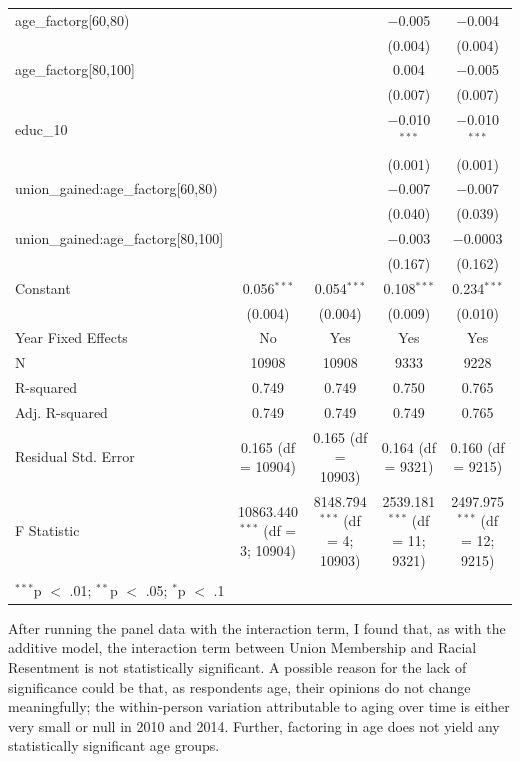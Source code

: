 \documentclass[12pt,letterpaper]{article}
\begin{document}
\begin{table}[H]
{\begin{tabular}{@{\extracolsep{5pt}}lcccc}
		age\_factorg[60,80) &  &  & $-$0.005 & $-$0.004 \\ 
		&  &  & (0.004) & (0.004) \\ 
		age\_factorg[80,100] &  &  & 0.004 & $-$0.005 \\ 
		&  &  & (0.007) & (0.007) \\ 
		educ\_10 &  &  & $-$0.010$^{***}$ & $-$0.010$^{***}$ \\ 
		&  &  & (0.001) & (0.001) \\ 
		union\_gained:age\_factorg[60,80) &  &  & $-$0.007 & $-$0.007 \\ 
		&  &  & (0.040) & (0.039) \\ 
		union\_gained:age\_factorg[80,100] &  &  & $-$0.003 & $-$0.0003 \\ 
		&  &  & (0.167) & (0.162) \\ 
		Constant & 0.056$^{***}$ & 0.054$^{***}$ & 0.108$^{***}$ & 0.234$^{***}$ \\ 
		& (0.004) & (0.004) & (0.009) & (0.010) \\ 
		Year Fixed Effects & No & Yes & Yes & Yes \\ 
		N & 10908 & 10908 & 9333 & 9228 \\ 
		R-squared & 0.749 & 0.749 & 0.750 & 0.765 \\ 
		Adj. R-squared & 0.749 & 0.749 & 0.749 & 0.765 \\ 
		Residual Std. Error & 0.165 (df = 10904) & 0.165 (df = 10903) & 0.164 (df = 9321) & 0.160 (df = 9215) \\ 
		F Statistic & 10863.440$^{***}$ (df = 3; 10904) & 8148.794$^{***}$ (df = 4; 10903) & 2539.181$^{***}$ (df = 11; 9321) & 2497.975$^{***}$ (df = 12; 9215) \\ 
		\hline \\[-1.8ex] 
		\multicolumn{5}{l}{$^{***}$p $<$ .01; $^{**}$p $<$ .05; $^{*}$p $<$ .1} \\ 
	\end{tabular} 
}

\end{table} 
After running the panel data with the interaction term, I found that, as with the additive model, the interaction term between Union Membership and Racial Resentment is not statistically significant. A possible reason for the lack of significance could be that, as respondents age, their opinions do not change meaningfully; the within-person variation attributable to aging over time is either very small or null in 2010 and 2014. Further, factoring in age does not yield any statistically significant age groups. 
\end{document}
